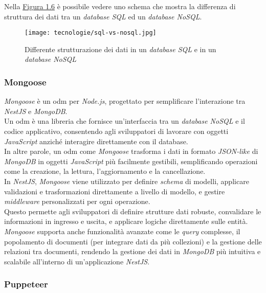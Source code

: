 \noindent Nella {\hyperref[fig:sql-nosql]{Figura 1.6}} è possibile vedere uno schema che mostra la differenza di struttura dei dati tra un \textit{database SQL} ed un \textit{database NoSQL}.

\begin{figure}[H]
    \label{fig:sql-nosql}
    \centering
    \texttt{[image: tecnologie/sql-vs-nosql.jpg]}
    \caption{Differente strutturazione dei dati in un \textit{database SQL} e in un \textit{database NoSQL}}
    \cite{site:sql-nosql}
\end{figure}

\pagebreak
\subsubsection{Mongoose}

\textit{Mongoose} è un \gls{odm} per \textit{Node.js}, progettato per semplificare l'interazione tra \textit{NestJS} e \textit{MongoDB}. \\
Un \gls{odm} è una libreria che fornisce un'interfaccia tra un \textit{database NoSQL} e il codice applicativo, consentendo agli sviluppatori di lavorare con oggetti \textit{JavaScript} anziché interagire direttamente con il database. \\
In altre parole, un \gls{odm} come \textit{Mongoose} trasforma i dati in formato \textit{JSON-like} di \textit{MongoDB} in oggetti \textit{JavaScript} più facilmente gestibili, semplificando operazioni come la creazione, la lettura, l'aggiornamento e la cancellazione.\\

\noindent In \textit{NestJS}, \textit{Mongoose} viene utilizzato per definire \textit{schema} di modelli, applicare validazioni e trasformazioni direttamente a livello di modello, e gestire \textit{middleware} personalizzati per ogni operazione.\\
Questo permette agli sviluppatori di definire strutture dati robuste, convalidare le informazioni in ingresso e uscita, e applicare logiche direttamente sulle entità. \\
\textit{Mongoose} supporta anche funzionalità avanzate come le \textit{query} complesse, il popolamento di documenti (per integrare dati da più collezioni) e la gestione delle relazioni tra documenti, rendendo la gestione dei dati in \textit{MongoDB} più intuitiva e scalabile all'interno di un'applicazione \textit{NestJS}.

\subsubsection{Puppeteer}

